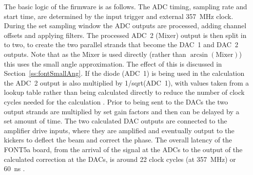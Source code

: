 The basic logic of the firmware is as follows. The ADC timing, sampling rate and start time, are determined by the input trigger and external 357~MHz clock. During the set sampling window the ADC outputs are processed, adding channel offsets and applying filters. The processed ADC~2 (Mixer) output is then split in to two, to create the two parallel strands that become the DAC~1 and DAC~2 outputs. Note that as the Mixer is used directly (rather than \(\arcsin(\mathrm{Mixer})\)) this uses the small angle approximation. The effect of this is discussed in Section~\ref{ss:fontSmallAng}. If the diode (ADC~1) is being used in the calculation the ADC~2 output is also multiplied by 1/sqrt(ADC~1), with values taken from a lookup table rather than being calculated directly to reduce the number of clock cycles needed for the calculation \cite{glennCLIC13}. Prior to being sent to the DACs the two output strands are multiplied by set gain factors and then can be delayed by a set amount of time. The two calculated DAC outputs are connected to the amplifier drive inputs, where they are amplified and eventually output to the kickers to deflect the beam and correct the phase. 
The overall latency of the FONT5a board, from the arrival of the signal at the ADCs to the output of the calculated correction at the DACs, is around 22 clock cycles (at 357~MHz) or 60~ns \cite{glennCLIC14}.


